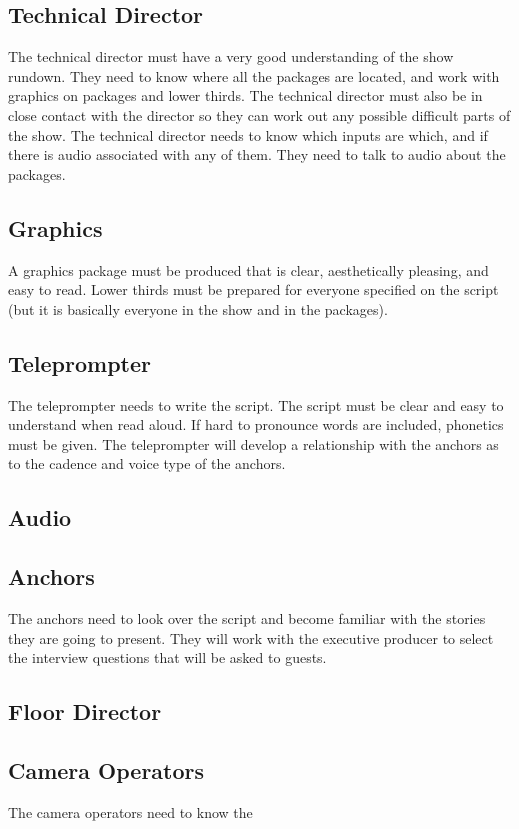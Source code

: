 \documentclass[letterpaper,10pt,oneside]{article}
\begin{document}
\subsection{Technical Director}
The technical director must have a very good understanding of the show rundown. They need to know where all the packages are located, and work with graphics on packages and lower thirds. The technical director must also be in close contact with the director so they can work out any possible difficult parts of the show. The technical director needs to know which inputs are which, and if there is audio associated with any of them. They need to talk to audio about the packages.

\subsection{Graphics}
A graphics package must be produced that is clear, aesthetically pleasing, and easy to read. Lower thirds must be prepared for everyone specified on the script (but it is basically everyone in the show and in the packages).

\subsection{Teleprompter}
The teleprompter needs to write the script. The script must be clear and easy to understand when read aloud. If hard to pronounce words are included, phonetics must be given. The teleprompter will develop a relationship with the anchors as to the cadence and voice type of the anchors.

\subsection{Audio}

\subsection{Anchors}
The anchors need to look over the script and become familiar with the stories they are going to present. They will work with the executive producer to select the interview questions that will be asked to guests.

\subsection{Floor Director}

\subsection{Camera Operators}
The camera operators need to know the
\end{document}
